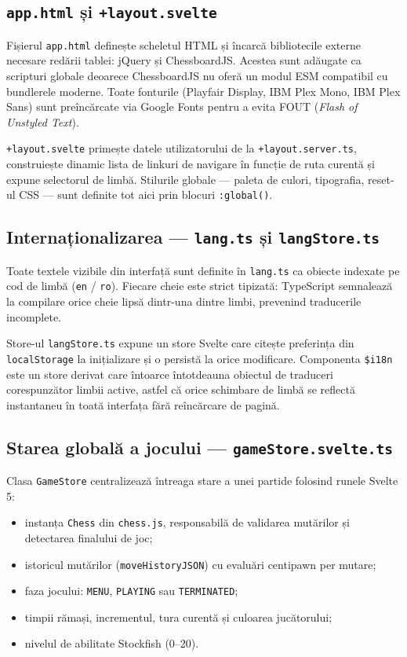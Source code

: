 \documentclass[12pt,a4paper]{article}
\begin{document}
\subsection{\texttt{app.html} și \texttt{+layout.svelte}}

Fișierul \texttt{app.html} definește scheletul HTML și încarcă bibliotecile externe necesare redării tablei: jQuery și ChessboardJS. Acestea sunt adăugate ca scripturi globale deoarece ChessboardJS nu oferă un modul ESM compatibil cu bundlerele moderne. Toate fonturile (Playfair Display, IBM Plex Mono, IBM Plex Sans) sunt preîncărcate via Google Fonts pentru a evita FOUT (\textit{Flash of Unstyled Text}).

\texttt{+layout.svelte} primește datele utilizatorului de la \texttt{+layout.server.ts}, construiește dinamic lista de linkuri de navigare în funcție de ruta curentă și expune selectorul de limbă. Stilurile globale — paleta de culori, tipografia, reset-ul CSS — sunt definite tot aici prin blocuri \texttt{:global()}.

\subsection{Internaționalizarea — \texttt{lang.ts} și \texttt{langStore.ts}}

Toate textele vizibile din interfață sunt definite în \texttt{lang.ts} ca obiecte indexate pe cod de limbă (\texttt{en} / \texttt{ro}). Fiecare cheie este strict tipizată: TypeScript semnalează la compilare orice cheie lipsă dintr-una dintre limbi, prevenind traducerile incomplete.

Store-ul \texttt{langStore.ts} expune un store Svelte care citește preferința din \texttt{localStorage} la inițializare și o persistă la orice modificare. Componenta \texttt{\$i18n} este un store derivat care întoarce întotdeauna obiectul de traduceri corespunzător limbii active, astfel că orice schimbare de limbă se reflectă instantaneu în toată interfața fără reîncărcare de pagină.

\subsection{Starea globală a jocului — \texttt{gameStore.svelte.ts}}

Clasa \texttt{GameStore} centralizează întreaga stare a unei partide folosind runele Svelte 5:
\begin{itemize}
  \item instanța \texttt{Chess} din \texttt{chess.js}, responsabilă de validarea mutărilor și detectarea finalului de joc;
  \item istoricul mutărilor (\texttt{moveHistoryJSON}) cu evaluări centipawn per mutare;
  \item faza jocului: \texttt{MENU}, \texttt{PLAYING} sau \texttt{TERMINATED};
  \item timpii rămași, incrementul, tura curentă și culoarea jucătorului;
  \item nivelul de abilitate Stockfish (0–20).
\end{itemize}
\end{document}
